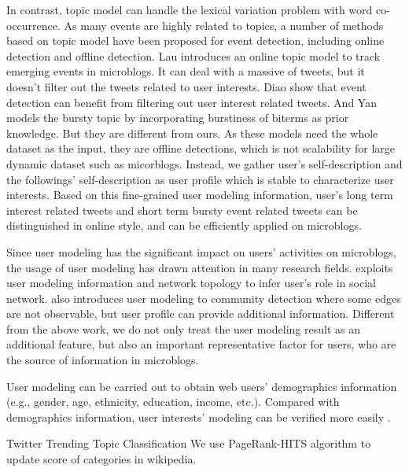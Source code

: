 \documentclass[conference,compsoc]{IEEEtran}
\begin{document}
In contrast, topic model can handle the lexical variation problem with word co-occurrence\cite{blei2003latent}.
As many events are highly related to topics, a number of methods based on topic model have been proposed for event detection, including online detection and offline detection.
Lau\cite{lau2012line} introduces an online topic model to track emerging events in microblogs.
It can deal with a massive of tweets, but it doesn't filter out the tweets related to user interests.
Diao\cite{timeUserLDA2012finding}\cite{diao2013unified} show that event detection can benefit from filtering out user interest related tweets. 
And Yan\cite{Yan:2015wm} models the bursty topic by incorporating burstiness of biterms as prior knowledge.
But they are different from ours.
As these models need the whole dataset as the input, they are offline detections, which is not scalability for large dynamic dataset such as micorblogs.
Instead, we gather user's self-description and the followings' self-description as user profile which is stable to characterize user interests. 
Based on this fine-grained user modeling information, user's long term interest related tweets and short term bursty event related tweets can be distinguished in online style, and can be efficiently applied on microblogs.

Since user modeling has the significant impact on users' activities on microblogs, the usage of user modeling has drawn attention in many research fields. 
\cite{zhao2013inferring} exploits user modeling information and network topology to infer user's role in social network.
\cite{yoshida2013toward} also introduces user modeling to community detection where some edges are not observable, but user profile can provide additional information.
Different from the above work, we do not only treat the user modeling result as an additional feature, but also an important representative factor for users, who are the source of information in microblogs.

User modeling can be carried out to obtain web users' demographics information \cite{culotta2015predicting} (e.g., gender, age, ethnicity, education, income, etc.).
Compared with demographics information, user interests' modeling can be verified more easily \cite{faralli2015large}. 


Twitter Trending Topic Classification
We use PageRank-HITS\cite{Yan:2015wq} algorithm to update score of categories in wikipedia.
\end{document}
